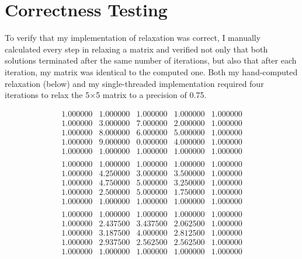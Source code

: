 \documentclass[12pt]{article}
\begin{document}
\section{Correctness Testing}

To verify that my implementation of relaxation was correct, I manually calculated every step in relaxing a matrix and verified not only that both solutions terminated after the same number of iterations, but also that after each iteration, my matrix was identical to the computed one. Both my hand-computed relaxation (below) and my single-threaded implementation required four iterations to relax the 5$\times$5 matrix to a precision of 0.75.
\hspace{-0.2cm}\begin{minipage}{.5\textwidth}
$$
\begin{matrix}
1.000000 & 1.000000 & 1.000000 & 1.000000 & 1.000000 \\
1.000000 & 3.000000 & 7.000000 & 2.000000 & 1.000000 \\
1.000000 & 8.000000 & 6.000000 & 5.000000 & 1.000000 \\
1.000000 & 9.000000 & 0.000000 & 4.000000 & 1.000000 \\
1.000000 & 1.000000 & 1.000000 & 1.000000 & 1.000000 \\
\end{matrix}
$$
$$
\begin{matrix}
1.000000 & 1.000000 & 1.000000 & 1.000000 & 1.000000 \\
1.000000 & 4.250000 & 3.000000 & 3.500000 & 1.000000 \\
1.000000 & 4.750000 & 5.000000 & 3.250000 & 1.000000 \\
1.000000 & 2.500000 & 5.000000 & 1.750000 & 1.000000 \\
1.000000 & 1.000000 & 1.000000 & 1.000000 & 1.000000 \\
\end{matrix}
$$
$$
\begin{matrix}
1.000000 & 1.000000 & 1.000000 & 1.000000 & 1.000000 \\ 
1.000000 & 2.437500 & 3.437500 & 2.062500 & 1.000000 \\ 
1.000000 & 3.187500 & 4.000000 & 2.812500 & 1.000000 \\ 
1.000000 & 2.937500 & 2.562500 & 2.562500 & 1.000000 \\ 
1.000000 & 1.000000 & 1.000000 & 1.000000 & 1.000000 \\ 
\end{matrix}
$$
$$
\begin{matrix}

\end{matrix}$$
\end{minipage}
\end{document}
